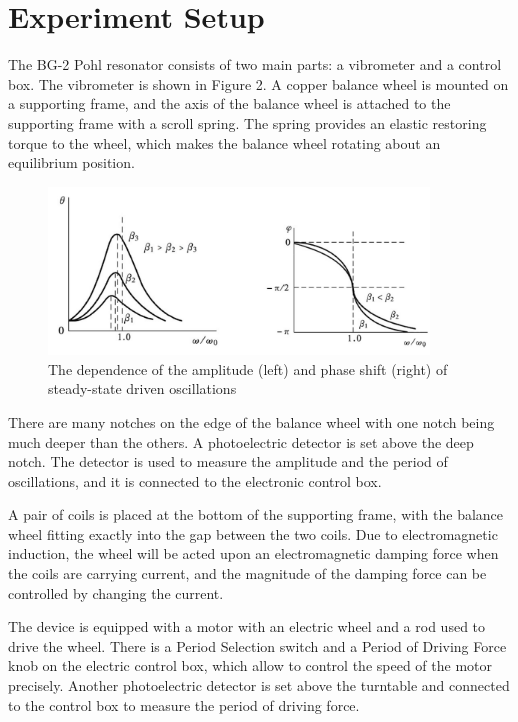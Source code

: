 \section{Experiment Setup}

The BG-2 Pohl resonator consists of two main parts: a vibrometer and a control
box. The vibrometer is shown in Figure 2. A copper balance wheel is mounted on a
supporting frame, and the axis of the balance wheel is attached to the
supporting frame with a scroll spring. The spring provides an elastic restoring
torque to the wheel, which makes the balance wheel rotating about an equilibrium
position. 

\begin{figure}[H]
\centering
\includegraphics[width=0.9\textwidth]{fig/es1}
\caption{The dependence of the amplitude (left) and phase shift (right) of
  steady-state driven oscillations}
\label{aps} 
\end{figure}

There are many notches on the edge of the balance wheel with one notch being
much deeper than the others. A photoelectric detector is set above the deep
notch. The detector is used to measure the amplitude and the period of
oscillations, and it is connected to the electronic control box. 

A pair of coils is placed at the bottom of the supporting frame, with the
balance wheel fitting exactly into the gap between the two coils. Due to
electromagnetic induction, the wheel will be acted upon an electromagnetic
damping force when the coils are carrying current, and the magnitude of the
damping force can be controlled by changing the current. 

The device is equipped with a motor with an electric wheel and a rod used to
drive the wheel. There is a Period Selection switch and a Period of Driving
Force knob on the electric control box, which allow to control the speed of the
motor precisely. Another photoelectric detector is set above the turntable and
connected to the control box to measure the period of driving force. 

